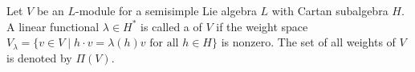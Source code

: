Let $V$ be an $L$-module for a semisimple Lie algebra $L$ with Cartan subalgebra $H$. A linear functional $\lambda \in H^*$ is called a  of $V$ if the weight space $V_\lambda = \{v \in V \mid h \cdot v = \lambda(h)v \text{ for all } h \in H\}$ is nonzero. The set of all weights of $V$ is denoted by $\Pi(V)$.

